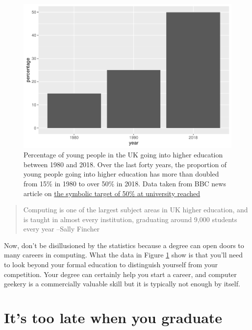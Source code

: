 \documentclass[
]{book}
\begin{document}
\begin{figure}

{\centering \includegraphics[width=1\linewidth]{cdyf_files/figure-latex/lotsofgrads-fig-1} 

}

\caption{Percentage of young people in the UK going into higher education between 1980 and 2018. Over the last forty years, the proportion of young people going into higher education has more than doubled from 15\% in 1980 to over 50\% in 2018. Data taken from BBC news article on \href{https://www.bbc.co.uk/news/education-49841620}{the symbolic target of 50\% at university reached} \citep{lotsofgrads}}\label{fig:lotsofgrads-fig}
\end{figure}



\begin{quote}
Computing is one of the largest subject areas in UK higher education, and is taught in almost every institution, graduating around 9,000 students every year --Sally Fincher \citep{fincherreview}
\end{quote}

Now, don't be disillusioned by the statistics because a degree can open doors to many careers in computing. What the data in Figure \ref{fig:lotsofgrads-fig} show is that you'll need to look beyond your formal education to distinguish yourself from your competition. Your degree can certainly help you start a career, and computer geekery is a commercially valuable skill but it is typically not enough by itself.

\hypertarget{thisstuffmatters}{%
\section{It's too late when you graduate}\label{thisstuffmatters}}
\end{document}
